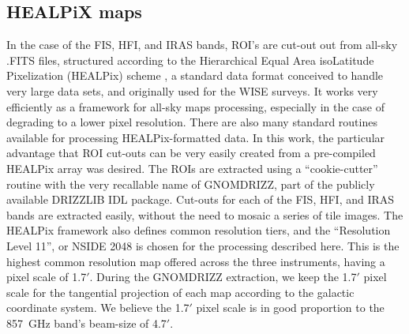 \subsection{HEALPiX maps}
     In the case of the FIS, HFI, and IRAS bands, ROI’s are cut-out out from all-sky .FITS files, structured according to the Hierarchical Equal Area isoLatitude Pixelization (HEALPix) scheme \citep{healpix05}, a standard data format conceived to handle very large data sets, and originally used for the WISE surveys. It works very efficiently as a framework for all-sky maps processing, especially in the case of degrading to a lower pixel resolution. There are also many standard routines available for processing HEALPix-formatted data. 
     In this work, the particular advantage that ROI cut-outs can be very easily created from a pre-compiled HEALPix array was desired. The ROIs are extracted using a “cookie-cutter” routine with the very recallable name of GNOMDRIZZ, part of the publicly available DRIZZLIB IDL package.  Cut-outs for each of the FIS, HFI, and IRAS bands are extracted easily, without the need to mosaic a series of tile images.  The HEALPix framework also defines common resolution tiers, and the “Resolution Level 11”, or NSIDE 2048 is chosen for the processing described here. This is the highest common resolution map offered across the three instruments, having a pixel scale of 1.7$'$. During the GNOMDRIZZ extraction, we keep the 1.7$'$ pixel scale for the tangential projection of each map according to the galactic coordinate system. We believe the 1.7$'$ pixel scale is in good proportion to the 857~GHz band’s beam-size of 4.7$'$.
